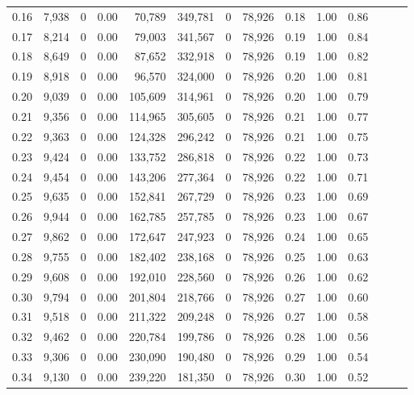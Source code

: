 \begin{tabular}{rrrrrrrrrrrrrr}
0.16 &  7,938 &      0 &  0.00 &   70,789 &  349,781 &       0 &  78,926 &  0.18 &  1.00 &      0.86 \\
0.17 &  8,214 &      0 &  0.00 &   79,003 &  341,567 &       0 &  78,926 &  0.19 &  1.00 &      0.84 \\
0.18 &  8,649 &      0 &  0.00 &   87,652 &  332,918 &       0 &  78,926 &  0.19 &  1.00 &      0.82 \\
0.19 &  8,918 &      0 &  0.00 &   96,570 &  324,000 &       0 &  78,926 &  0.20 &  1.00 &      0.81 \\
0.20 &  9,039 &      0 &  0.00 &  105,609 &  314,961 &       0 &  78,926 &  0.20 &  1.00 &      0.79 \\
0.21 &  9,356 &      0 &  0.00 &  114,965 &  305,605 &       0 &  78,926 &  0.21 &  1.00 &      0.77 \\
0.22 &  9,363 &      0 &  0.00 &  124,328 &  296,242 &       0 &  78,926 &  0.21 &  1.00 &      0.75 \\
0.23 &  9,424 &      0 &  0.00 &  133,752 &  286,818 &       0 &  78,926 &  0.22 &  1.00 &      0.73 \\
0.24 &  9,454 &      0 &  0.00 &  143,206 &  277,364 &       0 &  78,926 &  0.22 &  1.00 &      0.71 \\
0.25 &  9,635 &      0 &  0.00 &  152,841 &  267,729 &       0 &  78,926 &  0.23 &  1.00 &      0.69 \\
0.26 &  9,944 &      0 &  0.00 &  162,785 &  257,785 &       0 &  78,926 &  0.23 &  1.00 &      0.67 \\
0.27 &  9,862 &      0 &  0.00 &  172,647 &  247,923 &       0 &  78,926 &  0.24 &  1.00 &      0.65 \\
0.28 &  9,755 &      0 &  0.00 &  182,402 &  238,168 &       0 &  78,926 &  0.25 &  1.00 &      0.63 \\
0.29 &  9,608 &      0 &  0.00 &  192,010 &  228,560 &       0 &  78,926 &  0.26 &  1.00 &      0.62 \\
0.30 &  9,794 &      0 &  0.00 &  201,804 &  218,766 &       0 &  78,926 &  0.27 &  1.00 &      0.60 \\
0.31 &  9,518 &      0 &  0.00 &  211,322 &  209,248 &       0 &  78,926 &  0.27 &  1.00 &      0.58 \\
0.32 &  9,462 &      0 &  0.00 &  220,784 &  199,786 &       0 &  78,926 &  0.28 &  1.00 &      0.56 \\
0.33 &  9,306 &      0 &  0.00 &  230,090 &  190,480 &       0 &  78,926 &  0.29 &  1.00 &      0.54 \\
0.34 &  9,130 &      0 &  0.00 &  239,220 &  181,350 &       0 &  78,926 &  0.30 &  1.00 &      0.52 \\

\end{tabular}
